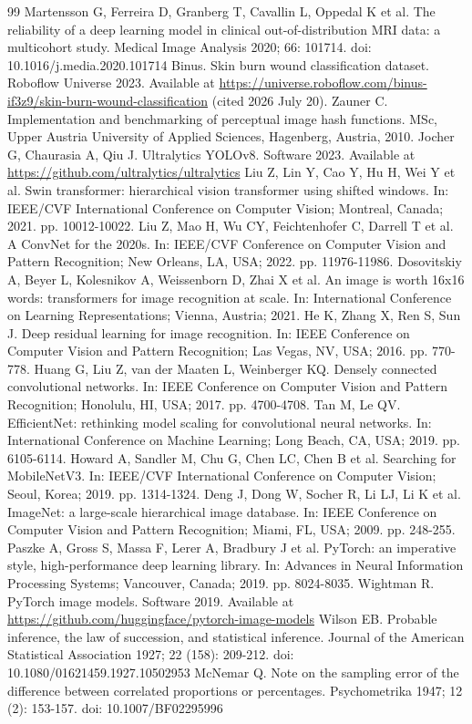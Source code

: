 \documentclass{elektr}
\begin{document}
\begin{thebibliography}{99}
 Martensson G, Ferreira D, Granberg T, Cavallin L, Oppedal K et al. The reliability of a deep learning model in clinical out-of-distribution MRI data: a multicohort study. Medical Image Analysis 2020; 66: 101714. doi: 10.1016/j.media.2020.101714
 Binus. Skin burn wound classification dataset. Roboflow Universe 2023. Available at \url{https://universe.roboflow.com/binus-if3z9/skin-burn-wound-classification} (cited 2026 July 20).
 Zauner C. Implementation and benchmarking of perceptual image hash functions. MSc, Upper Austria University of Applied Sciences, Hagenberg, Austria, 2010.
 Jocher G, Chaurasia A, Qiu J. Ultralytics YOLOv8. Software 2023. Available at \url{https://github.com/ultralytics/ultralytics}
 Liu Z, Lin Y, Cao Y, Hu H, Wei Y et al. Swin transformer: hierarchical vision transformer using shifted windows. In: IEEE/CVF International Conference on Computer Vision; Montreal, Canada; 2021. pp. 10012-10022.
 Liu Z, Mao H, Wu CY, Feichtenhofer C, Darrell T et al. A ConvNet for the 2020s. In: IEEE/CVF Conference on Computer Vision and Pattern Recognition; New Orleans, LA, USA; 2022. pp. 11976-11986.
 Dosovitskiy A, Beyer L, Kolesnikov A, Weissenborn D, Zhai X et al. An image is worth 16x16 words: transformers for image recognition at scale. In: International Conference on Learning Representations; Vienna, Austria; 2021.
 He K, Zhang X, Ren S, Sun J. Deep residual learning for image recognition. In: IEEE Conference on Computer Vision and Pattern Recognition; Las Vegas, NV, USA; 2016. pp. 770-778.
 Huang G, Liu Z, van der Maaten L, Weinberger KQ. Densely connected convolutional networks. In: IEEE Conference on Computer Vision and Pattern Recognition; Honolulu, HI, USA; 2017. pp. 4700-4708.
 Tan M, Le QV. EfficientNet: rethinking model scaling for convolutional neural networks. In: International Conference on Machine Learning; Long Beach, CA, USA; 2019. pp. 6105-6114.
 Howard A, Sandler M, Chu G, Chen LC, Chen B et al. Searching for MobileNetV3. In: IEEE/CVF International Conference on Computer Vision; Seoul, Korea; 2019. pp. 1314-1324.
 Deng J, Dong W, Socher R, Li LJ, Li K et al. ImageNet: a large-scale hierarchical image database. In: IEEE Conference on Computer Vision and Pattern Recognition; Miami, FL, USA; 2009. pp. 248-255.
 Paszke A, Gross S, Massa F, Lerer A, Bradbury J et al. PyTorch: an imperative style, high-performance deep learning library. In: Advances in Neural Information Processing Systems; Vancouver, Canada; 2019. pp. 8024-8035.
 Wightman R. PyTorch image models. Software 2019. Available at \url{https://github.com/huggingface/pytorch-image-models}
 Wilson EB. Probable inference, the law of succession, and statistical inference. Journal of the American Statistical Association 1927; 22 (158): 209-212. doi: 10.1080/01621459.1927.10502953
 McNemar Q. Note on the sampling error of the difference between correlated proportions or percentages. Psychometrika 1947; 12 (2): 153-157. doi: 10.1007/BF02295996
\end{thebibliography}
\end{document}
